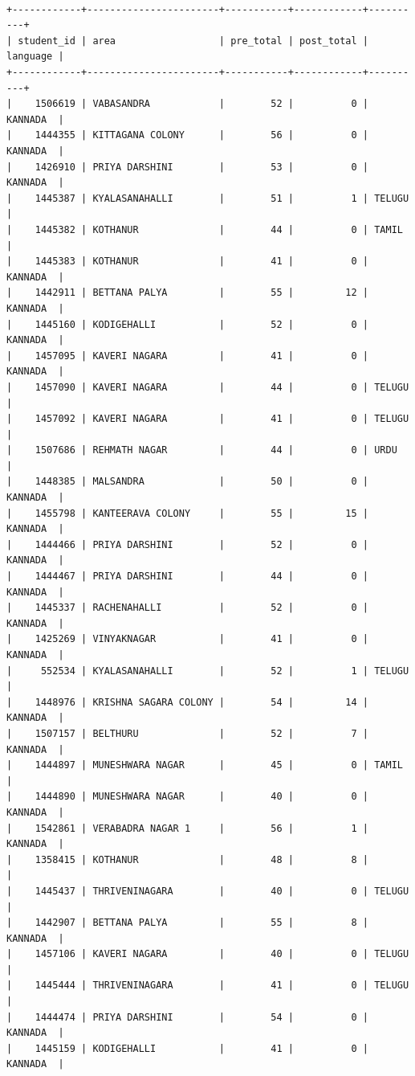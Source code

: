 \documentclass[10pt]{article}
\begin{document}
\begin{itemize}
{\tt
\begin{verbatim}
+------------+-----------------------+-----------+------------+----------+
| student_id | area                  | pre_total | post_total | language |
+------------+-----------------------+-----------+------------+----------+
|    1506619 | VABASANDRA            |        52 |          0 | KANNADA  |
|    1444355 | KITTAGANA COLONY      |        56 |          0 | KANNADA  |
|    1426910 | PRIYA DARSHINI        |        53 |          0 | KANNADA  |
|    1445387 | KYALASANAHALLI        |        51 |          1 | TELUGU   |
|    1445382 | KOTHANUR              |        44 |          0 | TAMIL    |
|    1445383 | KOTHANUR              |        41 |          0 | KANNADA  |
|    1442911 | BETTANA PALYA         |        55 |         12 | KANNADA  |
|    1445160 | KODIGEHALLI           |        52 |          0 | KANNADA  |
|    1457095 | KAVERI NAGARA         |        41 |          0 | KANNADA  |
|    1457090 | KAVERI NAGARA         |        44 |          0 | TELUGU   |
|    1457092 | KAVERI NAGARA         |        41 |          0 | TELUGU   |
|    1507686 | REHMATH NAGAR         |        44 |          0 | URDU     |
|    1448385 | MALSANDRA             |        50 |          0 | KANNADA  |
|    1455798 | KANTEERAVA COLONY     |        55 |         15 | KANNADA  |
|    1444466 | PRIYA DARSHINI        |        52 |          0 | KANNADA  |
|    1444467 | PRIYA DARSHINI        |        44 |          0 | KANNADA  |
|    1445337 | RACHENAHALLI          |        52 |          0 | KANNADA  |
|    1425269 | VINYAKNAGAR           |        41 |          0 | KANNADA  |
|     552534 | KYALASANAHALLI        |        52 |          1 | TELUGU   |
|    1448976 | KRISHNA SAGARA COLONY |        54 |         14 | KANNADA  |
|    1507157 | BELTHURU              |        52 |          7 | KANNADA  |
|    1444897 | MUNESHWARA NAGAR      |        45 |          0 | TAMIL    |
|    1444890 | MUNESHWARA NAGAR      |        40 |          0 | KANNADA  |
|    1542861 | VERABADRA NAGAR 1     |        56 |          1 | KANNADA  |
|    1358415 | KOTHANUR              |        48 |          8 |          |
|    1445437 | THRIVENINAGARA        |        40 |          0 | TELUGU   |
|    1442907 | BETTANA PALYA         |        55 |          8 | KANNADA  |
|    1457106 | KAVERI NAGARA         |        40 |          0 | TELUGU   |
|    1445444 | THRIVENINAGARA        |        41 |          0 | TELUGU   |
|    1444474 | PRIYA DARSHINI        |        54 |          0 | KANNADA  |
|    1445159 | KODIGEHALLI           |        41 |          0 | KANNADA  |

\end{verbatim}}
\end{itemize}
\end{document}
